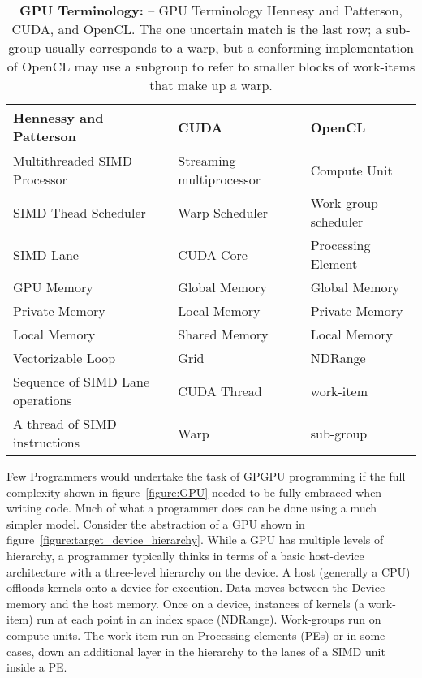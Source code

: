 \begin{table}[!htbp]
\centering
\caption{\textbf{GPU Terminology: } 
-- \small
GPU Terminology Hennesy and Patterson, CUDA, and 
OpenCL.   The one uncertain match is the last row;
a sub-group usually corresponds to a warp, but a conforming implementation of OpenCL 
may use a subgroup to refer to smaller blocks of work-items that make up a warp.}
\label{table:GPUjargon}
\begin{tabular}{|l|l|l|}
\hline
\textbf{Hennessy and Patterson}  & \textbf{CUDA} & \textbf{OpenCL} \\
\hline
Multithreaded SIMD Processor    & Streaming multiprocessor & Compute Unit \\
\hline
SIMD Thead Scheduler               & Warp Scheduler                 & Work-group scheduler \\
\hline
SIMD Lane                                  & CUDA Core                        & Processing Element \\
\hline
GPU Memory                              & Global Memory                   & Global Memory \\
\hline
Private Memory                          & Local Memory                     & Private Memory \\
\hline
Local Memory                            & Shared Memory                   & Local Memory \\
\hline
Vectorizable Loop                       & Grid                                     & NDRange \\
\hline
Sequence of SIMD Lane operations & CUDA Thread                & work-item \\
\hline
A thread of SIMD instructions            & Warp                              & sub-group \\
\hline
\end{tabular}
\end{table}

Few Programmers would undertake the task of GPGPU programming if the full complexity shown in figure~\ref{figure:GPU}
needed to be fully embraced when writing code.  Much of what a programmer does can be done using a much 
simpler model.  Consider the abstraction of a GPU shown in figure~\ref{figure:target_device_hierarchy}.
While a GPU has multiple levels of hierarchy, a programmer typically thinks in terms of a basic host-device
architecture with a three-level hierarchy on the device.  A host (generally a CPU) offloads kernels onto a device
for execution.   Data moves between the Device memory and the host memory.   Once on a device, instances 
of kernels (a work-item) run at each point in an index space (NDRange).  Work-groups run on compute units.
The work-item run on Processing elements (PEs) or in some cases, down an additional layer in the hierarchy to 
the lanes of a SIMD unit inside a PE.

